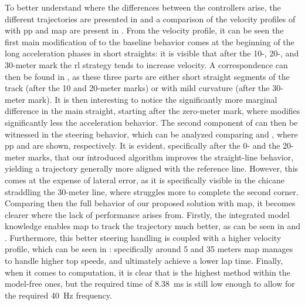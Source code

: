 \documentclass[letterpaper, conference]{IEEEtran}
\begin{document}
To better understand where the differences between the controllers arise, the different trajectories are presented in  and a comparison of the velocity profiles of {\namealgo} with \gls{pp} and \gls{map} are present in .
From the velocity profile, it can be seen the first main modification of {\namealgo} to the baseline behavior comes at the beginning of the long acceleration phases in short straights: it is visible that after the 10-, 20-, and 30-meter mark the \gls{rl} strategy tends to increase velocity. A correspondence can then be found in , as these three parts are either short straight segments of the track (after the 10 and 20-meter marks) or with mild curvature (after the 30-meter mark). It is then interesting to notice the significantly more marginal difference in the main straight, starting after the zero-meter mark, where {\namealgo} modifies significantly less the acceleration behavior. 
The second component of {\namealgo} can then be witnessed in the steering behavior, which can be analyzed comparing  and , where \gls{pp} and {\namealgo} are shown, respectively.
It is evident, specifically after the 0- and the 20-meter marks, that our introduced algorithm improves the straight-line behavior, yielding a trajectory generally more aligned with the reference line. However, this comes at the expense of lateral error, as it is specifically visible in the chicane straddling the 30-meter line, where {\namealgo} struggles more to complete the second corner. 
Comparing then the full behavior of our proposed solution with \gls{map}, it becomes clearer where the lack of performance arises from. 
Firstly, the integrated model knowledge enables \gls{map} to track the trajectory much better, as can be seen in  and .
Furthermore, this better steering handling is coupled with a higher velocity profile, which can be seen in : specifically around 5 and 35 meters \gls{map} manages to handle higher top speeds, and ultimately achieve a lower lap time.
Finally, when it comes to computation, it is clear that {\namealgo} is the highest method within the model-free ones, but the required time of \qty{8.38}{\milli \second} is still low enough to allow for the required \qty{40}{\hertz} frequency. 
\end{document}
